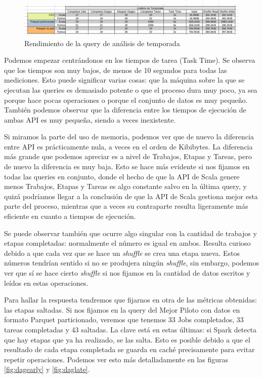\documentclass[12pt,twoside,titlepage]{report}
\begin{document}
\begin{figure}[H]
	\includegraphics[scale=0.4]{analisistemporada.png}
	\centering
	\caption{Rendimiento de la query de análisis de temporada}
	\label{fig:companalisistemporada}
	\centering
\end{figure}

Podemos empezar centrándonos en los tiempos de tarea (Task Time). Se observa que los tiempos son muy bajos, de menos de 10 segundos para todas las mediciones. Esto puede significar varias cosas: que la máquina sobre la que se ejecutan las queries es demasiado potente o que el proceso dura muy poco, ya sea porque hace pocas operaciones o porque el conjunto de datos es muy pequeño. También podemos observar que la diferencia entre los tiempos de ejecución de ambas API es muy pequeña, siendo a veces inexistente.

Si miramos la parte del uso de memoria, podemos ver que de nuevo la diferencia entre API es prácticamente nula, a veces en el orden de Kibibytes. La diferencia más grande que podemos apreciar es a nivel de Trabajos, Etapas y Tareas, pero de nuevo la diferencia es muy baja. Esto se hace más evidente si nos fijamos en todas las queries en conjunto, donde el hecho de que la API de Scala genere menos Trabajos, Etapas y Tareas es algo constante salvo en la última query, y quizá podríamos llegar a la conclusión de que la API de Scala gestiona mejor esta parte del proceso, mientras que a veces su contraparte resulta ligeramente más eficiente en cuanto a tiempos de ejecución.

Se puede observar también que ocurre algo singular con la cantidad de trabajos y etapas completadas: normalmente el número es igual en ambos. Resulta curioso debido a que cada vez que se hace un \textit{shuffle} se crea una etapa nueva. Estos números tendrían sentido si no se produjera ningún \textit{shuffle}, sin embargo, podemos ver que sí se hace cierto \textit{shuffle} si nos fijamos en la cantidad de datos escritos y leídos en estas operaciones.

Para hallar la respuesta tendremos que fijarnos en otra de las métricas obtenidas: las etapas saltadas. Si nos fijamos en la query del Mejor Piloto con datos en formato Parquet particionado, veremos que tenemos 33 Jobs completados, 33 tareas completadas y 43 saltadas. La clave está en estas últimas: si Spark detecta que hay etapas que ya ha realizado, se las salta. Esto es posible debido a que el resultado de cada etapa completada se guarda en caché precisamente para evitar repetir operaciones. Podemos ver esto más detalladamente en las figuras \ref{fig:dagearly} y \ref{fig:daglate}.
\end{document}

